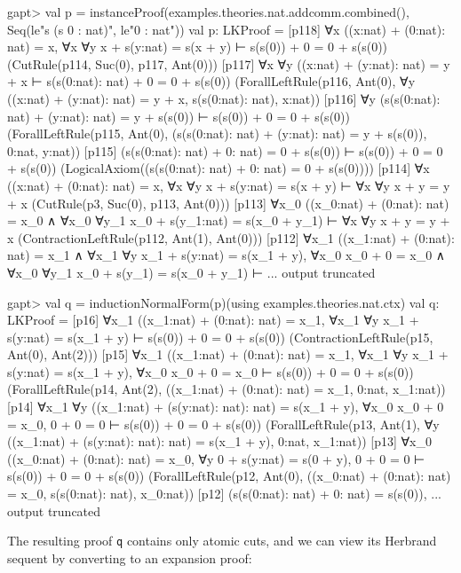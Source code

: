 \documentclass[a4paper,11pt]{book}
\begin{document}
\begin{clilisting}
gapt> val p = instanceProof(examples.theories.nat.addcomm.combined(),                                     Seq(le"s (s 0 : nat)", le"0 : nat"))
val p: LKProof = [p118] ∀x ((x:nat) + (0:nat): nat) = x,
∀x ∀y x + s(y:nat) = s(x + y)
⊢
s(s(0)) + 0 = 0 + s(s(0))    (CutRule(p114, Suc(0), p117, Ant(0)))
[p117] ∀x ∀y ((x:nat) + (y:nat): nat) = y + x ⊢ s(s(0:nat): nat) + 0 = 0 + s(s(0))    (ForallLeftRule(p116, Ant(0), ∀y ((x:nat) + (y:nat): nat) = y + x, s(s(0:nat): nat), x:nat))
[p116] ∀y (s(s(0:nat): nat) + (y:nat): nat) = y + s(s(0)) ⊢ s(s(0)) + 0 = 0 + s(s(0))    (ForallLeftRule(p115, Ant(0), (s(s(0:nat): nat) + (y:nat): nat) = y + s(s(0)), 0:nat, y:nat))
[p115] (s(s(0:nat): nat) + 0: nat) = 0 + s(s(0)) ⊢ s(s(0)) + 0 = 0 + s(s(0))    (LogicalAxiom((s(s(0:nat): nat) + 0: nat) = 0 + s(s(0))))
[p114] ∀x ((x:nat) + (0:nat): nat) = x,
∀x ∀y x + s(y:nat) = s(x + y)
⊢
∀x ∀y x + y = y + x    (CutRule(p3, Suc(0), p113, Ant(0)))
[p113] ∀x_0 ((x_0:nat) + (0:nat): nat) = x_0 ∧
  ∀x_0
  ∀y_1
  x_0 + s(y_1:nat) = s(x_0 + y_1)
⊢
∀x ∀y x + y = y + x    (ContractionLeftRule(p112, Ant(1), Ant(0)))
[p112] ∀x_1 ((x_1:nat) + (0:nat): nat) = x_1 ∧ ∀x_1 ∀y x_1 + s(y:nat) = s(x_1 + y),
∀x_0 x_0 + 0 = x_0 ∧ ∀x_0 ∀y_1 x_0 + s(y_1) = s(x_0 + y_1)
⊢
... output truncated

gapt> val q = inductionNormalForm(p)(using examples.theories.nat.ctx)
val q: LKProof = [p16] ∀x_1 ((x_1:nat) + (0:nat): nat) = x_1,
∀x_1 ∀y x_1 + s(y:nat) = s(x_1 + y)
⊢
s(s(0)) + 0 = 0 + s(s(0))    (ContractionLeftRule(p15, Ant(0), Ant(2)))
[p15] ∀x_1 ((x_1:nat) + (0:nat): nat) = x_1,
∀x_1 ∀y x_1 + s(y:nat) = s(x_1 + y),
∀x_0 x_0 + 0 = x_0
⊢
s(s(0)) + 0 = 0 + s(s(0))    (ForallLeftRule(p14, Ant(2), ((x_1:nat) + (0:nat): nat) = x_1, 0:nat, x_1:nat))
[p14] ∀x_1 ∀y ((x_1:nat) + (s(y:nat): nat): nat) = s(x_1 + y),
∀x_0 x_0 + 0 = x_0,
0 + 0 = 0
⊢
s(s(0)) + 0 = 0 + s(s(0))    (ForallLeftRule(p13, Ant(1), ∀y ((x_1:nat) + (s(y:nat): nat): nat) = s(x_1 + y), 0:nat, x_1:nat))
[p13] ∀x_0 ((x_0:nat) + (0:nat): nat) = x_0,
∀y 0 + s(y:nat) = s(0 + y),
0 + 0 = 0
⊢
s(s(0)) + 0 = 0 + s(s(0))    (ForallLeftRule(p12, Ant(0), ((x_0:nat) + (0:nat): nat) = x_0, s(s(0:nat): nat), x_0:nat))
[p12] (s(s(0:nat): nat) + 0: nat) = s(s(0)),
... output truncated

\end{clilisting}

The resulting proof \texttt{q} contains only atomic cuts, and we can view its Herbrand
sequent by converting to an expansion proof:
\end{document}
